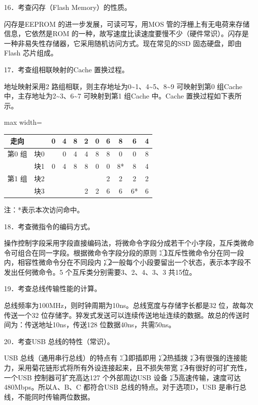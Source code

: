 \documentclass[UTF8,11pt]{ctexart}
\begin{document}
16．考查闪存（Flash Memory）的性质。


闪存是EEPROM 的进一步发展，可读可写，用MOS 管的浮栅上有无电荷来存储信息，它依然是ROM 的一种，故写速度比读速度要慢不少（硬件常识）。闪存是一种非易失性存储器，它采用随机访问方式。现在常见的SSD 固态硬盘，即由Flash 芯片组成。


17．考查组相联映射的Cache 置换过程。


地址映射采用2 路组相联，则主存地址为0\textasciitilde{}1、4\textasciitilde{}5、8\textasciitilde{}9 可映射到第0 组Cache 中，主存地址为2\textasciitilde{}3、6\textasciitilde{}7 可映射到第1 组Cache 中。Cache 置换过程如下表所示。


\begin{center}\begin{adjustbox}{max width=\linewidth}\begin{tabular}{|c|c|c|c|c|c|c|c|c|c|c|}\hline
走向 &  & 0 & 4 & 8 & 2 & 0 & 6 & 8 & 6 & 4\\\hline
第0 组 & 块0 &  & 0 & 4 & 4 & 8 & 8 & 0 & 0 & 8\\\hline
 & 块1 & 0 & 4 & 8 & 8 & 0 & 0 & 8* & 8 & 4\\\hline
第1 组 & 块2 &  &  &  &  &  & 2 & 2 & 2 & 2\\\hline
 & 块3 &  &  &  & 2 & 2 & 6 & 6 & 6* & 6\\\hline\end{tabular}\end{adjustbox}\end{center}

注：*表示本次访问命中。


18．考查微指令的编码方式。


操作控制字段采用字段直接编码法，将微命令字段分成若干个小字段，互斥类微命令可组合在同一字段。根据微命令字段分段的原则：\textcircled{1}互斥性微命令分在同一段内，相容性微命令分在不同段内；\textcircled{2}一般每个小段要留出一个状态，表示本字段不发出任何微命令。5 个互斥类分别需要3、2、4、3、3 共15位。


19．考查总线传输性能的计算。


总线频率为100MHz，则时钟周期为10ns。总线宽度与存储字长都是32 位，故每次传送一个32 位存储字。猝发式发送可以连续传送地址连续的数据。故总的传送时间为：传送地址10ns，传送128 位数据40ns，共需50ns。


20．考查USB 总线的特性（常识）。


USB 总线（通用串行总线）的特点有：\textcircled{1}即插即用；\textcircled{2}热插拨；\textcircled{3}有很强的连接能力，采用菊花链形式将所有外设连接起来，且不损失带宽；\textcircled{4}有很好的可扩充性，一个USB 控制器可扩充高达127 个外部周边USB 设备；\textcircled{5}高速传输，速度可达480Mbps。所以A、B、C 都符合USB 总线的特点。对于选项D，USB 是串行总线，不能同时传输两位数据。
\end{document}

